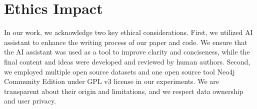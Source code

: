 \section*{Ethics Impact}
In our work, we acknowledge two key ethical considerations. First, we utilized AI assistant to enhance the writing process of our paper and code. We ensure that the AI assistant was used as a tool to improve clarity and conciseness, while the final content and ideas were developed and reviewed by human authors. Second, we employed multiple open source datasets and one open source tool Neo4j Community Edition \citep{10.1145/2384716.2384777} under GPL v3 license in our experiments. We are transparent about their origin and limitations, and we respect data ownership and user privacy. 


